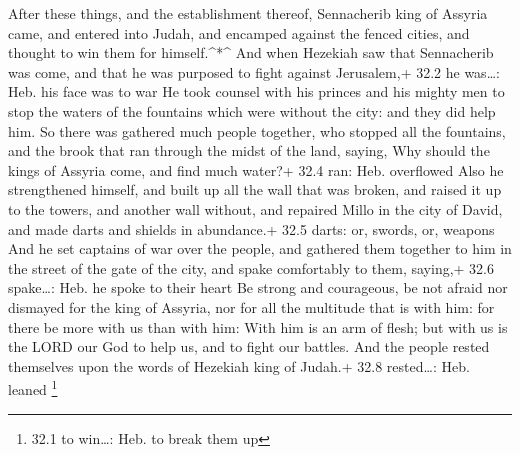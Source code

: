  After these things, and the establishment thereof,
Sennacherib king of Assyria came, and entered into Judah, and encamped
against the fenced cities, and thought to win them for himself.\^{}*\^{}
 And when Hezekiah saw that Sennacherib was come, and that
he was purposed to fight against Jerusalem,+ 32.2 he was\ldots: Heb. his
face was to war  He took counsel with his princes and his
mighty men to stop the waters of the fountains which were without the
city: and they did help him.  So there was gathered much
people together, who stopped all the fountains, and the brook that ran
through the midst of the land, saying, Why should the kings of Assyria
come, and find much water?+ 32.4 ran: Heb. overflowed  Also
he strengthened himself, and built up all the wall that was broken, and
raised it up to the towers, and another wall without, and repaired Millo
in the city of David, and made darts and shields in abundance.+ 32.5
darts: or, swords, or, weapons  And he set captains of war
over the people, and gathered them together to him in the street of the
gate of the city, and spake comfortably to them, saying,+ 32.6
spake\ldots: Heb. he spoke to their heart  Be strong and
courageous, be not afraid nor dismayed for the king of Assyria, nor for
all the multitude that is with him: for there be more with us than with
him:  With him is an arm of flesh; but with us is the LORD
our God to help us, and to fight our battles. And the people rested
themselves upon the words of Hezekiah king of Judah.+ 32.8 rested\ldots:
Heb. leaned \footnote{32.1 to win\ldots: Heb. to break them up}


